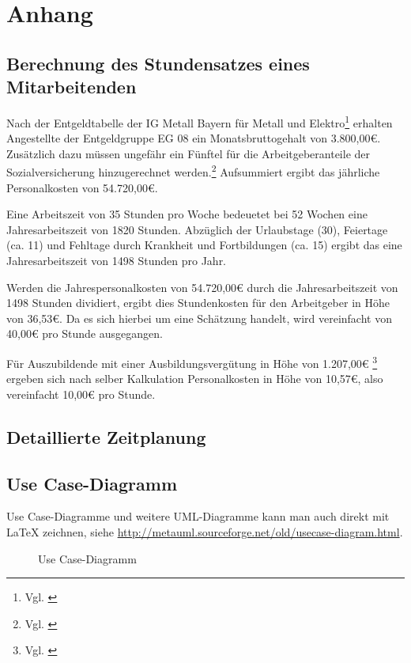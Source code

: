\section{Anhang}

\subsection{Berechnung des Stundensatzes eines Mitarbeitenden}
\label{app:Stundensatz}
Nach der Entgeldtabelle der IG Metall Bayern für Metall und Elektro\footnote{Vgl. \cite{Entgeldtabelle}} erhalten Angestellte der Entgeldgruppe EG 08 ein Monatsbruttogehalt von 3.800,00€. Zusätzlich dazu müssen ungefähr ein Fünftel für die Arbeitgeberanteile der Sozialversicherung hinzugerechnet werden.\footnote{Vgl. \cite{Personalkosten}} Aufsummiert ergibt das jährliche Personalkosten von 54.720,00€.

Eine Arbeitszeit von 35 Stunden pro Woche bedeuetet bei 52 Wochen eine Jahresarbeitszeit von 1820 Stunden. Abzüglich der Urlaubstage (30), Feiertage (ca. 11) und Fehltage durch Krankheit und Fortbildungen (ca. 15) ergibt das eine Jahresarbeitszeit von 1498 Stunden pro Jahr.

Werden die Jahrespersonalkosten von 54.720,00€ durch die Jahresarbeitszeit von 1498 Stunden dividiert, ergibt dies Stundenkosten für den Arbeitgeber in Höhe von 36,53€. Da es sich hierbei um eine Schätzung handelt, wird vereinfacht von 40,00€ pro Stunde ausgegangen.  

Für Auszubildende mit einer Ausbildungsvergütung in Höhe von 1.207,00€ \footnote{Vgl. \cite{EntgeldtabelleAzubis}} ergeben sich nach selber Kalkulation Personalkosten in Höhe von 10,57€, also vereinfacht 10,00€ pro Stunde.

\subsection{Detaillierte Zeitplanung}
\label{app:Zeitplanung}



\clearpage

\subsection{Use Case-Diagramm}
\label{app:UseCase}
Use Case-Diagramme und weitere \acs{UML}-Diagramme kann man auch direkt mit \LaTeX{} zeichnen, siehe \zB \url{http://metauml.sourceforge.net/old/usecase-diagram.html}.
\begin{figure}[htb]
\centering
{}
\caption{Use Case-Diagramm}
\end{figure}

